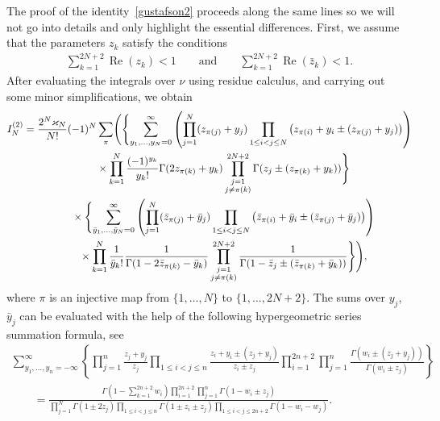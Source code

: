 \documentclass[pdftex]{sigma}
\numberwithin{equation}{section}
\begin{document}
The proof of the identity~\eqref{gustafson2} proceeds along the same lines so we will not go into details and only highlight the essential differences. First, we assume that the parameters $z_k$ satisfy the conditions
\begin{gather}\label{zz-cond}
\sum_{k=1}^{2N+2}\operatorname{Re}(z_k)<1 \qquad \text{and}\qquad \sum_{k=1}^{2N+2}\operatorname{Re}(\bar z_k)<1.
\end{gather}
After evaluating the integrals over $\nu$ using residue calculus, and carrying out some minor simplifications, we obtain
\begin{gather*}
I_N^{(2)} =\frac{2^N\varkappa_N}{N!}(-1)^N\sum_{\pi}
 \Biggl(\Biggl\{\sum_{y_{1},\ldots,y_{N}=0}^\infty
\left(\prod_{j=1}^N(z_{\pi(j)}+y_j)\prod_{1\leq i<j\leq N}\big(z_{\pi(i)}+y_i\pm(z_{\pi(j)}+y_j)\big)
\right)\\
\hphantom{I_N^{(2)} =}{} \times \prod_{k=1}^N \frac{(-1)^{y_k}}{y_k!} \Gamma(2 z_{\pi(k)}+y_k)\prod_{\substack{j=1\\j\neq \pi(k)}}^{2N+2}
{\Gamma(z_j\pm (z_{\pi(k)}+y_k))}\Biggr\}\notag\\
\hphantom{I_N^{(2)} =}{} \times
 \Biggl\{\sum_{\bar y_{1},\ldots,\bar y_{N}=0}^\infty
\left(\prod_{j=1}^N(\bar z_{\pi(j)}+\bar y_j)\prod_{1\leq i<j\leq N}
 \big(\bar z_{\pi(i)}+\bar y_i\pm(\bar z_{\pi(j)}+\bar y_j)\big)
\right) \notag\\
\hphantom{I_N^{(2)} =}{} \times \prod_{k=1}^N \frac{1}{\bar y_k!}
 \frac1{\Gamma(1-2\bar z_{\pi(k)}-\bar y_k)}\prod_{\substack{j=1\\j\neq \pi(k)}}^{2N+2}
\frac1{\Gamma(1-\bar z_j\pm (\bar z_{\pi(k)}+\bar y_k))}\Biggr\}\Biggr) ,
\end{gather*}
where $\pi$ is an injective map from $\{1,\ldots, N\}$ to $\{1,\ldots, 2N+2\}$. The sums over $y_j$, $\bar y_j$ can be
evaluated with the help of the following hypergeometric series summation formula, see \cite{MR1117471,Gustafson94}
\begin{gather*}
\sum_{y_1,\ldots,y_n=-\infty}^\infty \left\{\prod_{j=1}^n
 \frac{z_j+y_j}{z_j}\prod_{1\leq i<j\leq n}\frac{z_i+y_i\pm (z_j+y_j)}{z_i\pm z_j}
\prod_{i=1}^{2n+2}\prod_{j=1}^n\frac{\Gamma(w_i\pm(z_j+y_j))}{\Gamma(w_i\pm z_j)}
\right\}\\
\qquad{} = \frac{\Gamma\left(1-\sum\limits_{k=1}^{2n+2} w_i\right)\prod\limits_{i=1}^{2n+2}\prod\limits_{j=1}^n\Gamma(1-w_i\pm z_j)}{
\prod\limits_{j=1}^N\Gamma(1\pm 2 z_j){\prod\limits_{1\leq i<j\leq n} {\Gamma(1\pm z_i\pm z_j)}}
{\prod\limits_{1\leq i<j\leq 2n+2}{\Gamma(1-w_i-w_j) }}} .
\end{gather*}
\end{document}
